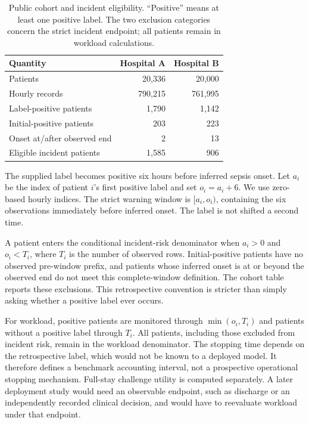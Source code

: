 \begin{table}[t]
\centering\small
\caption{Public cohort and incident eligibility. ``Positive'' means at least one positive label. The two exclusion categories concern the strict incident endpoint; all patients remain in workload calculations.}

\begin{tabular}{lrr}\toprule
Quantity & Hospital A & Hospital B\\\midrule
Patients & 20,336 & 20,000\\
Hourly records & 790,215 & 761,995\\
Label-positive patients & 1,790 & 1,142\\
Initial-positive patients & 203 & 223\\
Onset at/after observed end & 2 & 13\\
Eligible incident patients & 1,585 & 906\\\bottomrule
\end{tabular}
\end{table}

The supplied label becomes positive six hours before inferred sepsis onset. Let $a_i$ be the index of patient $i$'s first positive label and set $o_i=a_i+6$. We use zero-based hourly indices. The strict warning window is $[a_i,o_i)$, containing the six observations immediately before inferred onset. The label is not shifted a second time.

A patient enters the conditional incident-risk denominator when $a_i>0$ and $o_i<T_i$, where $T_i$ is the number of observed rows. Initial-positive patients have no observed pre-window prefix, and patients whose inferred onset is at or beyond the observed end do not meet this complete-window definition. The cohort table reports these exclusions. This retrospective convention is stricter than simply asking whether a positive label ever occurs.

For workload, positive patients are monitored through $\min(o_i,T_i)$ and patients without a positive label through $T_i$. All patients, including those excluded from incident risk, remain in the workload denominator. The stopping time depends on the retrospective label, which would not be known to a deployed model. It therefore defines a benchmark accounting interval, not a prospective operational stopping mechanism. Full-stay challenge utility is computed separately. A later deployment study would need an observable endpoint, such as discharge or an independently recorded clinical decision, and would have to reevaluate workload under that endpoint.


